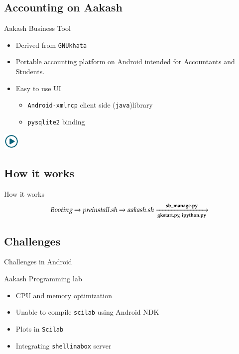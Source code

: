 \documentclass{beamer}
\begin{document}
  \subsection{Accounting on Aakash}
  \begin{frame}{Aakash Business Tool}
    \begin{itemize}
      \item Derived from {\tt GNUkhata}
      \item Portable accounting platform on Android intended for
        Accountants and Students.
      \item Easy to use UI
        \pause
        \begin{itemize}
          \item {\tt Android-xmlrcp} client side ({\tt java})library
          \item {\tt pysqlite2} binding
        \end{itemize}
    \end{itemize}
      \centerline{\href{file:///opt/techfest2013/abt.avi}{\includegraphics[height=0.8cm,width=0.8cm]{play.jpg}}}
  \end{frame}

  \subsection{How it works}
  \begin{frame}{How it works}
    \begin{equation*}
      Booting \xrightarrow[\text{}]{} 
      preinstall.sh \xrightarrow[\text{}]{}
      aakash.sh\xrightarrow[\text{\bf{gkstart.py, ipython.py}}]{\bf{sb\_manage.py}}
    \end{equation*}
  \end{frame}

  \subsection{Challenges}
  \begin{frame}{Challenges in Android}
    \begin{block}{Aakash Programming lab}
      \begin{itemize}
        \item CPU and memory optimization
        \item Unable to compile {\tt scilab} using Android NDK
        \item Plots in {\tt Scilab}
        \item Integrating {\tt shellinabox} server
      \end{itemize}
    \end{block}
    \end{frame}
\end{document}
